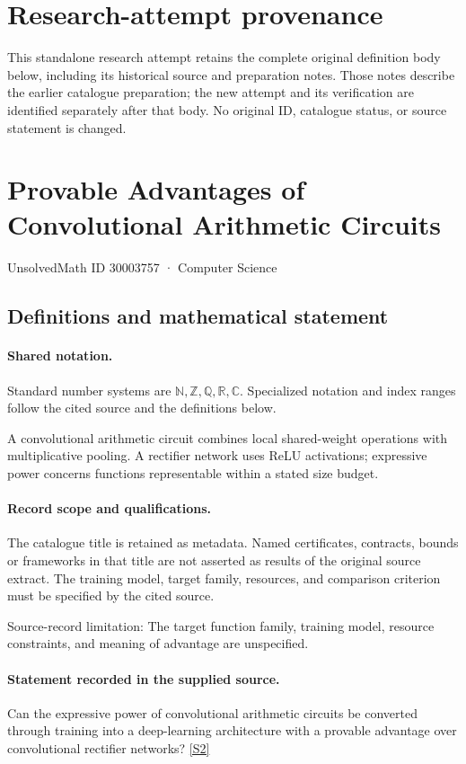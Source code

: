 \documentclass[11pt]{article}
\begin{document}
\section*{Research-attempt provenance}
This standalone research attempt retains the complete original definition body below,
including its historical source and preparation notes. Those notes describe the
earlier catalogue preparation; the new attempt and its verification are identified
separately after that body. No original ID, catalogue status, or source statement is changed.

\section{Provable Advantages of Convolutional Arithmetic Circuits}\label{30003757}
{\small UnsolvedMath ID 30003757 · Computer Science}
\subsection{Definitions and mathematical statement}

\paragraph{Shared notation.}Standard number systems are $\mathbb N,\mathbb Z,\mathbb Q,\mathbb R,\mathbb C$. Specialized notation and index ranges follow the cited source and the definitions below.


A convolutional arithmetic circuit combines local shared-weight operations with multiplicative pooling. A rectifier network uses ReLU activations; expressive power concerns functions representable within a stated size budget.
\paragraph{Record scope and qualifications.}
The catalogue title is retained as metadata. Named certificates, contracts, bounds or frameworks in that title are not asserted as results of the original source extract.
The training model, target family, resources, and comparison criterion must be specified by the cited source.

Source-record limitation: The target function family, training model, resource constraints, and meaning of advantage are unspecified.
\paragraph{Statement recorded in the supplied source.}
Can the expressive power of convolutional arithmetic circuits be converted through training into a deep-learning architecture with a provable advantage over convolutional rectifier networks? \href{https://doi.org/10.4171/owr/2018/14}{[S2]}
\end{document}
